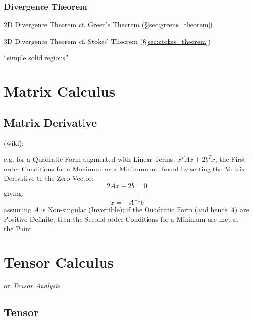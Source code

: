 \subsubsection{Divergence Theorem}\label{sec:divergence_theorem}

2D Divergence Theorem \fist cf. Green's Theorem (\S\ref{sec:greens_theorem})

3D Divergence Theorem \fist cf. Stokes' Theorem (\S\ref{sec:stokes_theorem})

``simple solid regions''



\section{Matrix Calculus}\label{sec:matrix_calculus}

\subsection{Matrix Derivative}\label{sec:matrix_derivative}

(wiki):

e.g. for a Quadratic Form augmented with Linear Terms, $x^TAx + 2b^Tx$, the
First-order Conditions for a Maximum or a Minimum are found by setting the
Matrix Derivative to the Zero Vector:
\[
  2Ax + 2b = 0
\]
giving:
\[
  x = -A^{-1}b
\]
assuming $A$ is Non-singular (Invertible); if the Quadratic Form (and hence
$A$) are Positive Definite, then the Second-order Conditions for a
Minimum are met at the Point



\section{Tensor Calculus}\label{sec:tensor_calculus}

or \emph{Tensor Analysis}



\subsection{Tensor}\label{sec:linear_tensor}

